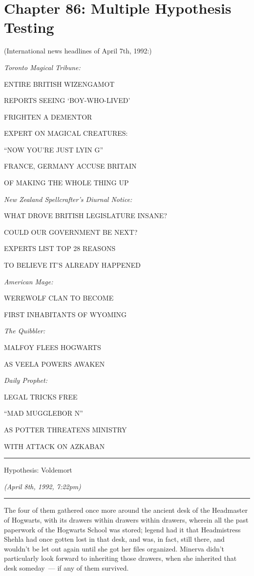 \chapter{Chapter 86: Multiple Hypothesis Testing}
(International news headlines of April 7th, 1992:)

\emph{Toronto Magical Tribune:}

ENTIRE BRITISH WIZENGAMOT

REPORTS SEEING `BOY-WHO-LIVED'

FRIGHTEN A DEMENTOR

EXPERT ON MAGICAL CREATURES:

``NOW YOU'RE JUST LYIN G''

FRANCE, GERMANY ACCUSE BRITAIN

OF MAKING THE WHOLE THING UP

\emph{New Zealand Spellcrafter's Diurnal Notice:}

WHAT DROVE BRITISH LEGISLATURE INSANE?

COULD OUR GOVERNMENT BE NEXT?

EXPERTS LIST TOP 28 REASONS

TO BELIEVE IT'S ALREADY HAPPENED

\emph{American Mage:}

WEREWOLF CLAN TO BECOME

FIRST INHABITANTS OF WYOMING

\emph{The Quibbler:}

MALFOY FLEES HOGWARTS

AS VEELA POWERS AWAKEN

\emph{Daily Prophet:}

LEGAL TRICKS FREE

``MAD MUGGLEBOR N''

AS POTTER THREATENS MINISTRY

WITH ATTACK ON AZKABAN

\begin{center}\rule{3in}{0.4pt}\end{center}

Hypothesis: Voldemort

\emph{(April 8th, 1992, 7:22pm)}

\begin{center}\rule{3in}{0.4pt}\end{center}

The four of them gathered once more around the ancient desk of the Headmaster of Hogwarts, with its drawers within drawers within drawers, wherein all the past paperwork of the Hogwarts School was stored; legend had it that Headmistress Shehla had once gotten lost in that desk, and was, in fact, still there, and wouldn't be let out again until she got her files organized. Minerva didn't particularly look forward to inheriting those drawers, when she inherited that desk someday~--- if any of them survived.

